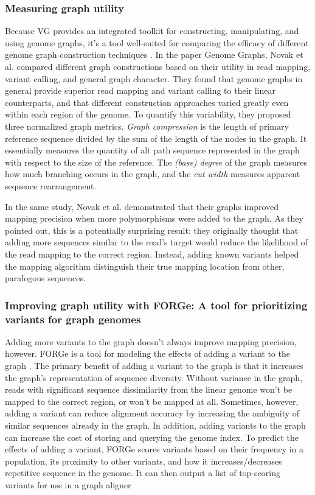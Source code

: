 \subsubsection{Measuring graph utility}

Because VG provides an integrated toolkit for constructing, manipulating, and using genome graphs, it's a tool well-suited for comparing the efficacy of different genome graph construction techniques \cite{Novak_2017, Garrison_2018}. In the paper Genome Graphs, Novak et al. compared different graph constructions based on their utility in read mapping, variant calling, and general graph character.
They found that genome graphs in general provide superior read mapping and variant calling to their linear counterparts, and that different construction approaches varied greatly even within each region of the genome.
To quantify this variability, they proposed three normalized graph metrics.
 \emph{Graph compression} is the length of primary reference sequence divided by the sum of the length of the nodes in the graph.
It essentially measures the quantity of alt path sequence represented in the graph with respect to the size of the reference.
The \emph{(base) degree} of the graph measures how much branching occurs in the graph, and the \emph{cut width} measures apparent sequence rearrangement.


In the same study, Novak et al. demonstrated that their graphs improved mapping precision when more polymorphisms were added to the graph.
As they pointed out, this is a potentially surprising result: they originally thought that adding more sequences similar to the read's target would reduce the likelihood of the read mapping to the correct region.
Instead, adding known variants helped the mapping algorithm distinguish their true mapping location from other, paralogous sequences.

\subsubsection{Improving graph utility with FORGe: A tool for prioritizing variants for graph genomes}

Adding more variants to the graph doesn't always improve mapping precision, however.
FORGe is a tool for modeling the effects of adding a variant to the graph \cite{Pritt_2018}. 
The primary benefit of adding a variant to the graph is that it increases the graph's representation of sequence diversity.
Without variance in the graph, reads with significant sequence dissimilarity from the linear genome won't be mapped to the correct region, or won't be mapped at all.
Sometimes, however, adding a variant can reduce alignment accuracy by increasing the ambiguity of similar sequences already in the graph.
In addition, adding variants to the graph can increase the cost of storing and querying the genome index.
To predict the effects of adding a variant, FORGe scores variants based on their frequency in a population, its proximity to other variants, and how it increases/decreases repetitive sequence in the genome.
It can then output a list of top-scoring variants for use in a graph aligner



